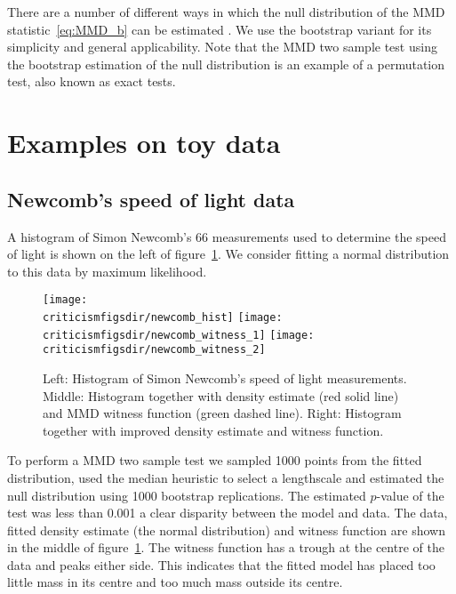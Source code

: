 There are a number of different ways in which the null distribution of the MMD statistic~\eqref{eq:MMD_b} can be estimated \citep[e.g.][]{Gretton2008-gs}.
We use the bootstrap variant for its simplicity and general applicability.
Note that the MMD two sample test using the bootstrap estimation of the null distribution is an example of a permutation test, also known as exact tests.

\section{Examples on toy data}

\subsection{Newcomb's speed of light data}

A histogram of Simon Newcomb's 66 measurements used to determine the speed of light \citep{Stigler1977-dd} is shown on the left of figure~\ref{fig:newcomb}.
We consider fitting a normal distribution to this data by maximum likelihood.

\begin{figure}[ht]
\centering
\texttt{[image: \\criticismfigsdir/newcomb\_hist]}
\texttt{[image: \\criticismfigsdir/newcomb\_witness\_1]}
\texttt{[image: \\criticismfigsdir/newcomb\_witness\_2]}
\caption[Speed of light data and witness functions.]{
Left: Histogram of Simon Newcomb's speed of light measurements.
Middle: Histogram together with density estimate (red solid line) and MMD witness function (green dashed line).
Right: Histogram together with improved density estimate and witness function.
}
\label{fig:newcomb}
\end{figure}

To perform a MMD two sample test we sampled 1000 points from the fitted distribution, used the median heuristic to select a lengthscale and estimated the null distribution using 1000 bootstrap replications.
The estimated $p$-value of the test was less than 0.001 \ie a clear disparity between the model and data.
The data, fitted density estimate (the normal distribution) and witness function are shown in the middle of figure~\ref{fig:newcomb}.
The witness function has a trough at the centre of the data and peaks either side.
This indicates that the fitted model has placed too little mass in its centre and too much mass outside its centre.

